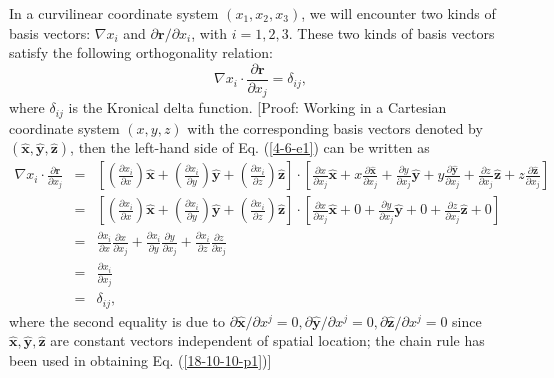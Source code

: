 \documentclass{article}
\begin{document}
In a curvilinear coordinate system $(x_1, x_2, x_3)$, we will encounter two
kinds of basis vectors: $\nabla x_i$ and $\partial \mathbf{r}/ \partial x_i$,
with $i = 1, 2, 3.$ These two kinds of basis vectors satisfy the following
orthogonality relation:
\begin{equation}
  \label{4-6-e1} \nabla x_i \cdot \frac{\partial \mathbf{r}}{\partial x_j} =
  \delta_{i j},
\end{equation}
where $\delta_{i j}$ is the Kronical delta function. [Proof: Working in a
Cartesian coordinate system $(x, y, z)$ with the corresponding basis vectors
denoted by $(\hat{\mathbf{x}}, \hat{\mathbf{y}}, \hat{\mathbf{z}})$, then the
left-hand side of Eq. (\ref{4-6-e1}) can be written as
\begin{eqnarray}
  \nabla x_i \cdot \frac{\partial \mathbf{r}}{\partial x_j} & = & \left[
  \left( \frac{\partial x_i}{\partial x} \right) \hat{\mathbf{x}} + \left(
  \frac{\partial x_i}{\partial y} \right) \hat{\mathbf{y}} + \left(
  \frac{\partial x_i}{\partial z} \right) \hat{\mathbf{z}} \right] \cdot
  \left[ \frac{\partial x}{\partial x_j} \hat{\mathbf{x}} + x \frac{\partial
  \hat{\mathbf{x}}}{\partial x_j} + \frac{\partial y}{\partial x_j}
  \hat{\mathbf{y}} + y \frac{\partial \hat{\mathbf{y}}}{\partial x_j} +
  \frac{\partial z}{\partial x_j} \hat{\mathbf{z}} + z \frac{\partial
  \hat{\mathbf{z}}}{\partial x_j} \right] \nonumber\\
  & = & \left[ \left( \frac{\partial x_i}{\partial x} \right)
  \hat{\mathbf{x}} + \left( \frac{\partial x_i}{\partial y} \right)
  \hat{\mathbf{y}} + \left( \frac{\partial x_i}{\partial z} \right)
  \hat{\mathbf{z}} \right] \cdot \left[ \frac{\partial x}{\partial x_j}
  \hat{\mathbf{x}} + 0 + \frac{\partial y}{\partial x_j} \hat{\mathbf{y}} + 0
  + \frac{\partial z}{\partial x_j} \hat{\mathbf{z}} + 0 \right] \\
  & = & \frac{\partial x_i}{\partial x} \frac{\partial x}{\partial x_j} +
  \frac{\partial x_i}{\partial y}  \frac{\partial y}{\partial x_j} +
  \frac{\partial x_i}{\partial z}  \frac{\partial z}{\partial x_j} \nonumber\\
  & = & \frac{\partial x_i}{\partial x_j}  \label{18-10-10-p1}\\
  & = & \delta_{i j}, \nonumber
\end{eqnarray}
where the second equality is due to $\partial \hat{\mathbf{x}} / \partial x^j
= 0, \partial \hat{\mathbf{y}} / \partial x^j = 0, \partial \hat{\mathbf{z}} /
\partial x^j = 0$ since $\hat{\mathbf{x}}, \hat{\mathbf{y}}, \hat{\mathbf{z}}$
are constant vectors independent of spatial location; the chain rule has been
used in obtaining Eq. (\ref{18-10-10-p1})]
\end{document}

